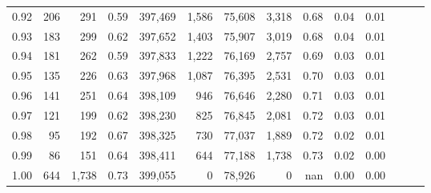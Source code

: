 \begin{tabular}{rrrrrrrrrrrrrr}
0.92 &    206 &    291 &  0.59 &  397,469 &    1,586 &  75,608 &   3,318 &  0.68 &  0.04 &      0.01 \\
0.93 &    183 &    299 &  0.62 &  397,652 &    1,403 &  75,907 &   3,019 &  0.68 &  0.04 &      0.01 \\
0.94 &    181 &    262 &  0.59 &  397,833 &    1,222 &  76,169 &   2,757 &  0.69 &  0.03 &      0.01 \\
0.95 &    135 &    226 &  0.63 &  397,968 &    1,087 &  76,395 &   2,531 &  0.70 &  0.03 &      0.01 \\
0.96 &    141 &    251 &  0.64 &  398,109 &      946 &  76,646 &   2,280 &  0.71 &  0.03 &      0.01 \\
0.97 &    121 &    199 &  0.62 &  398,230 &      825 &  76,845 &   2,081 &  0.72 &  0.03 &      0.01 \\
0.98 &     95 &    192 &  0.67 &  398,325 &      730 &  77,037 &   1,889 &  0.72 &  0.02 &      0.01 \\
0.99 &     86 &    151 &  0.64 &  398,411 &      644 &  77,188 &   1,738 &  0.73 &  0.02 &      0.00 \\
1.00 &    644 &  1,738 &  0.73 &  399,055 &        0 &  78,926 &       0 &   nan &  0.00 &      0.00 \\
\bottomrule
\end{tabular}
